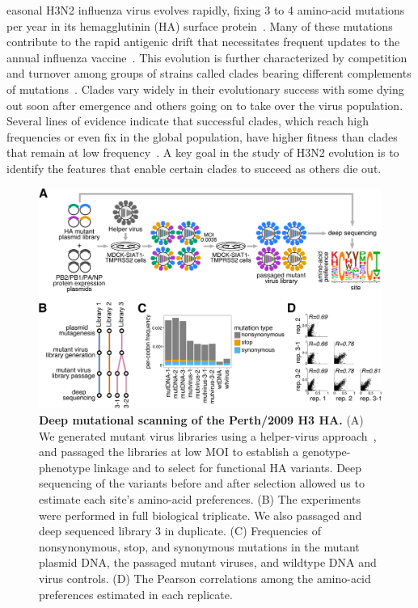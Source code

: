 \documentclass[9pt,twocolumn,twoside]{pnas-new}
\begin{document}
easonal H3N2 influenza virus evolves rapidly, fixing 3 to 4 amino-acid mutations per year in its hemagglutinin (HA) surface protein~\cite{fitch1997long, bhatt2011genomic}.
Many of these mutations contribute to the rapid antigenic drift that necessitates frequent updates to the annual influenza vaccine~\cite{smith2004mapping}.
This evolution is further characterized by competition and turnover among groups of strains called clades bearing different complements of mutations~\cite{bedford2011,strelkowa2012clonal,neher2014predicting,koelle2015effects,bedford2015global}.
Clades vary widely in their evolutionary success with some dying out soon after emergence and others going on to take over the virus population.
Several lines of evidence indicate that successful clades, which reach high frequencies or even fix in the global population, have higher fitness than clades that remain at low frequency~\cite{bedford2011,strelkowa2012clonal,neher2014predicting,luksza2014predictive}.
A key goal in the study of H3N2 evolution is to identify the features that enable certain clades to succeed as others die out.

\begin{figure}
\centering
\includegraphics[width=12cm]{figs/dms_overview/dms_overview.pdf}
\caption{\label{fig:dms_overview}
{\bf Deep mutational scanning of the Perth/2009 H3 HA.}
(A) We generated mutant virus libraries using a helper-virus approach~\cite{doud2016accurate}, and passaged the libraries at low MOI to establish a genotype-phenotype linkage and to select for functional HA variants.
Deep sequencing of the variants before and after selection allowed us to estimate each site's amino-acid preferences.
(B) The experiments were performed in full biological triplicate.
We also passaged and deep sequenced library 3 in duplicate.
(C) Frequencies of nonsynonymous, stop, and synonymous mutations in the mutant plasmid DNA, the passaged mutant viruses, and wildtype DNA and virus controls.
(D) The Pearson correlations among the amino-acid preferences estimated in each replicate.
}
\end{figure}
\end{document}
